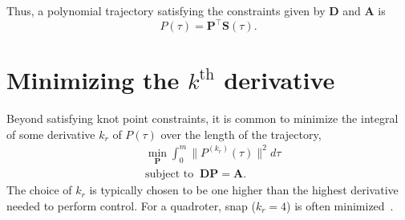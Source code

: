 Thus, a polynomial trajectory satisfying the constraints given by $\mathbf{D}$ and $\mathbf{A}$ is
\begin{equation}
	P(\tau) = \mathbf{P}^\top \mathbf{S}(\tau).
\end{equation}

\section{Minimizing the $k^\mathrm{th}$ derivative}
Beyond satisfying knot point constraints, it is common \cite{RichterBryRoy16,MellingerKumar11} 
to minimize the integral of some derivative $k_r$ of $P(\tau)$ over the length of the trajectory,
\begin{equation}
	\label{eq:min_derivative}
	\begin{aligned}
	&\min_{\mathbf{P}} \int_{0}^m \|P^{(k_r)}(\tau)\|^2 d\tau \\
	&\text{subject to } \: \mathbf{D}\mathbf{P} = \mathbf{A}. 
	\end{aligned}
\end{equation}
The choice of $k_r$ is typically chosen to be one higher than the highest derivative needed to perform control. 
For a quadroter, snap ($k_r = 4$) is often minimized~\cite{MellingerKumar11}.



